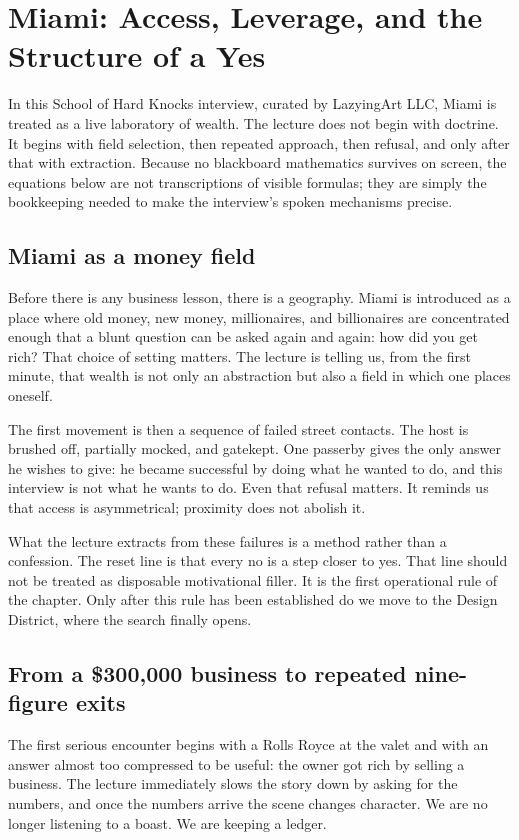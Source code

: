 \chapter{Miami: Access, Leverage, and the Structure of a Yes}

In this School of Hard Knocks interview, curated by LazyingArt LLC, Miami is treated as a live laboratory of wealth. The lecture does not begin with doctrine. It begins with field selection, then repeated approach, then refusal, and only after that with extraction. Because no blackboard mathematics survives on screen, the equations below are not transcriptions of visible formulas; they are simply the bookkeeping needed to make the interview's spoken mechanisms precise.

\section{Miami as a money field}

Before there is any business lesson, there is a geography. Miami is introduced as a place where old money, new money, millionaires, and billionaires are concentrated enough that a blunt question can be asked again and again: how did you get rich? That choice of setting matters. The lecture is telling us, from the first minute, that wealth is not only an abstraction but also a field in which one places oneself.

The first movement is then a sequence of failed street contacts. The host is brushed off, partially mocked, and gatekept. One passerby gives the only answer he wishes to give: he became successful by doing what he wanted to do, and this interview is not what he wants to do. Even that refusal matters. It reminds us that access is asymmetrical; proximity does not abolish it.

What the lecture extracts from these failures is a method rather than a confession. The reset line is that every no is a step closer to yes. That line should not be treated as disposable motivational filler. It is the first operational rule of the chapter. Only after this rule has been established do we move to the Design District, where the search finally opens.

\section{From a \$300{,}000 business to repeated nine-figure exits}

The first serious encounter begins with a Rolls Royce at the valet and with an answer almost too compressed to be useful: the owner got rich by selling a business. The lecture immediately slows the story down by asking for the numbers, and once the numbers arrive the scene changes character. We are no longer listening to a boast. We are keeping a ledger.

